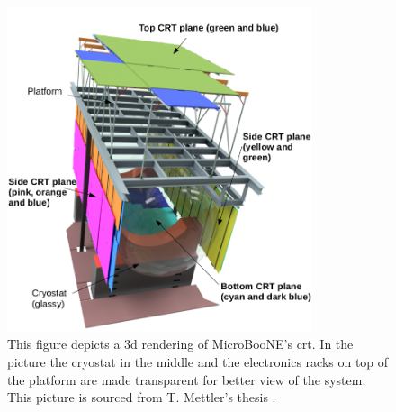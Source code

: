 \begin{figure}[htbp]
    \centering
    \includegraphics[width=0.8\textwidth]{images/MicroBooNE/CRTInstallationCAD.png}
    \caption[3D Rendering of MicroBooNE's CRT]{This figure depicts a \gls{3d} rendering of MicroBooNE's \gls{crt}. In the picture the cryostat in the middle and the electronics racks on top of the platform are made transparent for better view of the system. This picture is sourced from T. Mettler's thesis \cite{CRTThomasPhD}.}
    \label{fig:CRTInstallation}
\end{figure}

